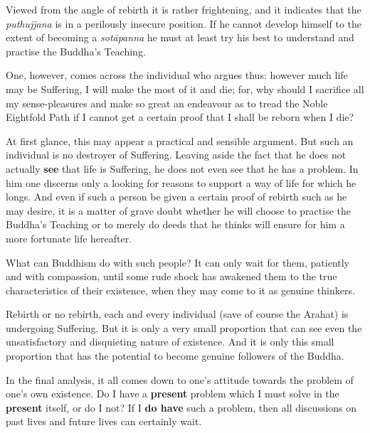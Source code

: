 Viewed from the angle of rebirth it is rather frightening, and it indicates that the \emph{puthujjana} is in a perilously insecure position. If he cannot develop himself to the extent of becoming a \emph{sotāpanna} he must at least try his best to understand and practise the Buddha's Teaching.

One, however, comes across the individual who argues thus: however much life may be Suffering, I will make the most of it and die; for, why should I sacrifice all my sense-pleasures and make so great an endeavour as to tread the Noble Eightfold Path if I cannot get a certain proof that I shall be reborn when I die?

At first glance, this may appear a practical and sensible argument. But such an individual is no destroyer of Suffering. Leaving aside the fact that he does not actually \textbf{see} that life is Suffering, he does not even see that he has a problem. In him one discerns only a looking for reasons to support a way of life for which he longs. And even if such a person be given a certain proof of rebirth such as he may desire, it is a matter of grave doubt whether he will choose to practise the Buddha's Teaching or to merely do deeds that he thinks will ensure for him a more fortunate life hereafter.

What can Buddhism do with such people? It can only wait for them, patiently and with compassion, until some rude shock has awakened them to the true characteristics of their existence, when they may come to it as genuine thinkers.

Rebirth or no rebirth, each and every individual (save of course the Arahat) is undergoing Suffering. But it is only a very small proportion that can see even the unsatisfactory and disquieting nature of existence. And it is only this small proportion that has the potential to become genuine followers of the Buddha.

In the final analysis, it all comes down to one's attitude towards the problem of one's own existence. Do I have a \textbf{present} problem which I must solve in the \textbf{present} itself, or do I not? If I \textbf{do have} such a problem, then all discussions on past lives and future lives can certainly wait.
